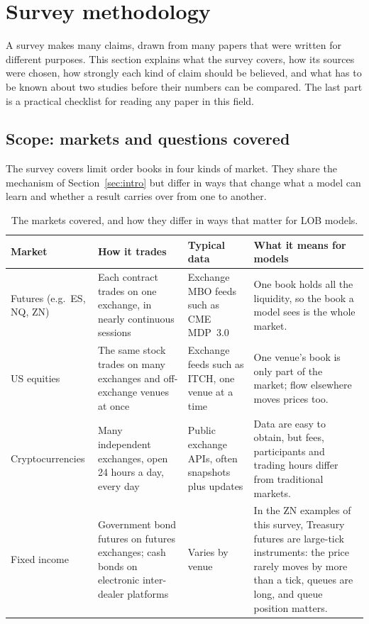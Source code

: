 \section{Survey methodology}
\label{sec:method}

A survey makes many claims, drawn from many papers that were written for different purposes. This
section explains what the survey covers, how its sources were chosen, how strongly each kind of
claim should be believed, and what has to be known about two studies before their numbers can be
compared. The last part is a practical checklist for reading any paper in this field.

\subsection{Scope: markets and questions covered}

The survey covers limit order books in four kinds of market. They share the mechanism of
Section~\ref{sec:intro} but differ in ways that change what a model can learn and whether a result
carries over from one to another.

\begin{table}[!htbp]
\centering\small
\caption{The markets covered, and how they differ in ways that matter for LOB models.}
\label{tab:markets}
\begin{tabularx}{\linewidth}{l*{3}{>{\raggedright\arraybackslash}X}}
\toprule
Market & How it trades & Typical data & What it means for models \\
\midrule
Futures (e.g.\ ES, NQ, ZN) & Each contract trades on one exchange, in nearly continuous sessions &
  Exchange MBO feeds such as CME MDP~3.0 & One book holds all the liquidity, so the book a model
  sees is the whole market. \\
US equities & The same stock trades on many exchanges and off-exchange venues at once & Exchange
  feeds such as ITCH, one venue at a time & One venue's book is only part of the market; flow
  elsewhere moves prices too. \\
Cryptocurrencies & Many independent exchanges, open 24 hours a day, every day & Public exchange
  APIs, often snapshots plus updates & Data are easy to obtain, but fees, participants and trading
  hours differ from traditional markets. \\
Fixed income & Government bond futures on futures exchanges; cash bonds on electronic
  inter-dealer platforms & Varies by venue & In the ZN examples of this survey, Treasury futures are large-tick instruments: the price rarely
  moves by more than a tick, queues are long, and queue position matters. \\
\bottomrule
\end{tabularx}
\end{table}

